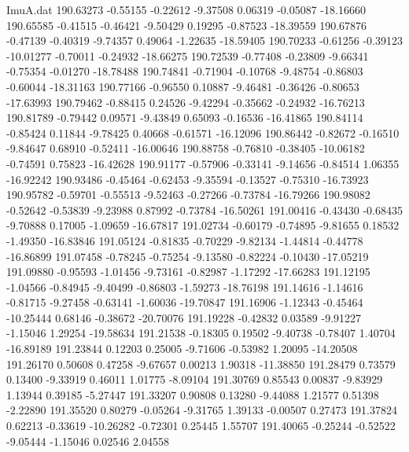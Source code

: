 \begin{filecontents}{ImuA.dat}
 190.63273   -0.55155   -0.22612   -9.37508    0.06319   -0.05087  -18.16660
 190.65585   -0.41515   -0.46421   -9.50429    0.19295   -0.87523  -18.39559
 190.67876   -0.47139   -0.40319   -9.74357    0.49064   -1.22635  -18.59405
 190.70233   -0.61256   -0.39123  -10.01277   -0.70011   -0.24932  -18.66275
 190.72539   -0.77408   -0.23809   -9.66341   -0.75354   -0.01270  -18.78488
 190.74841   -0.71904   -0.10768   -9.48754   -0.86803   -0.60044  -18.31163
 190.77166   -0.96550    0.10887   -9.46481   -0.36426   -0.80653  -17.63993
 190.79462   -0.88415    0.24526   -9.42294   -0.35662   -0.24932  -16.76213
 190.81789   -0.79442    0.09571   -9.43849    0.65093   -0.16536  -16.41865
 190.84114   -0.85424    0.11844   -9.78425    0.40668   -0.61571  -16.12096
 190.86442   -0.82672   -0.16510   -9.84647    0.68910   -0.52411  -16.00646
 190.88758   -0.76810   -0.38405  -10.06182   -0.74591    0.75823  -16.42628
 190.91177   -0.57906   -0.33141   -9.14656   -0.84514    1.06355  -16.92242
 190.93486   -0.45464   -0.62453   -9.35594   -0.13527   -0.75310  -16.73923
 190.95782   -0.59701   -0.55513   -9.52463   -0.27266   -0.73784  -16.79266
 190.98082   -0.52642   -0.53839   -9.23988    0.87992   -0.73784  -16.50261
 191.00416   -0.43430   -0.68435   -9.70888    0.17005   -1.09659  -16.67817
 191.02734   -0.60179   -0.74895   -9.81655    0.18532   -1.49350  -16.83846
 191.05124   -0.81835   -0.70229   -9.82134   -1.44814   -0.44778  -16.86899
 191.07458   -0.78245   -0.75254   -9.13580   -0.82224   -0.10430  -17.05219
 191.09880   -0.95593   -1.01456   -9.73161   -0.82987   -1.17292  -17.66283
 191.12195   -1.04566   -0.84945   -9.40499   -0.86803   -1.59273  -18.76198
 191.14616   -1.14616   -0.81715   -9.27458   -0.63141   -1.60036  -19.70847
 191.16906   -1.12343   -0.45464  -10.25444    0.68146   -0.38672  -20.70076
 191.19228   -0.42832    0.03589   -9.91227   -1.15046    1.29254  -19.58634
 191.21538   -0.18305    0.19502   -9.40738   -0.78407    1.40704  -16.89189
 191.23844    0.12203    0.25005   -9.71606   -0.53982    1.20095  -14.20508
 191.26170    0.50608    0.47258   -9.67657    0.00213    1.90318  -11.38850
 191.28479    0.73579    0.13400   -9.33919    0.46011    1.01775   -8.09104
 191.30769    0.85543    0.00837   -9.83929    1.13944    0.39185   -5.27447
 191.33207    0.90808    0.13280   -9.44088    1.21577    0.51398   -2.22890
 191.35520    0.80279   -0.05264   -9.31765    1.39133   -0.00507    0.27473
 191.37824    0.62213   -0.33619  -10.26282   -0.72301    0.25445    1.55707
 191.40065   -0.25244   -0.52522   -9.05444   -1.15046    0.02546    2.04558

\end{filecontents}
